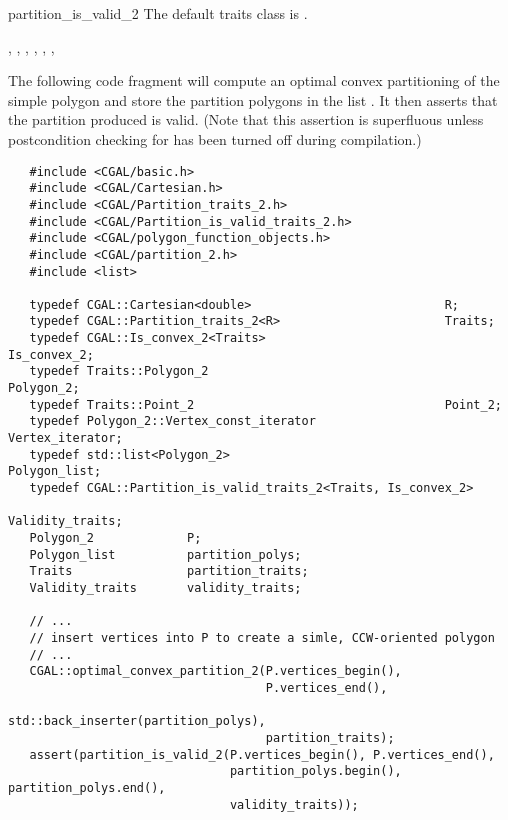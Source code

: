 \begin{ccRefFunction}{partition_is_valid_2}
The default traits class  is .%

\ccSeeAlso

,
,
,
,
,
,

\ccExample

The following code fragment will compute an optimal
convex partitioning of the simple polygon  
and store the partition polygons in the list .
It then asserts that the partition produced is valid.  (Note that
this assertion is superfluous unless postcondition checking for 
 has been turned off during compilation.)

\begin{verbatim}
   #include <CGAL/basic.h>
   #include <CGAL/Cartesian.h>
   #include <CGAL/Partition_traits_2.h>
   #include <CGAL/Partition_is_valid_traits_2.h>
   #include <CGAL/polygon_function_objects.h>
   #include <CGAL/partition_2.h>
   #include <list>

   typedef CGAL::Cartesian<double>                           R;
   typedef CGAL::Partition_traits_2<R>                       Traits;
   typedef CGAL::Is_convex_2<Traits>                         Is_convex_2;
   typedef Traits::Polygon_2                                 Polygon_2;
   typedef Traits::Point_2                                   Point_2;
   typedef Polygon_2::Vertex_const_iterator                  Vertex_iterator;
   typedef std::list<Polygon_2>                              Polygon_list;
   typedef CGAL::Partition_is_valid_traits_2<Traits, Is_convex_2>
                                                             Validity_traits;
   Polygon_2             P;
   Polygon_list          partition_polys;
   Traits                partition_traits;
   Validity_traits       validity_traits;

   // ...
   // insert vertices into P to create a simle, CCW-oriented polygon
   // ...
   CGAL::optimal_convex_partition_2(P.vertices_begin(),
                                    P.vertices_end(),
                                    std::back_inserter(partition_polys),
                                    partition_traits);
   assert(partition_is_valid_2(P.vertices_begin(), P.vertices_end(),
                               partition_polys.begin(), partition_polys.end(),
                               validity_traits));
\end{verbatim}

\end{ccRefFunction}
\renewcommand\ccRefPageBegin{\ccParDims\cgalColumnLayout}
\renewcommand\ccRefPageEnd{\ccParDims\cgalColumnLayout}

